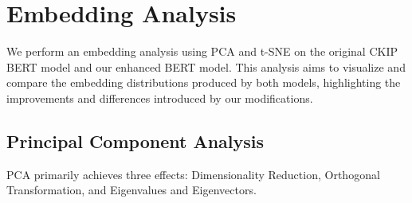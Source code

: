 \documentclass[PhD]{PHlab-thesis}
\begin{document}


\section{Embedding Analysis}
We perform an embedding analysis using PCA and t-SNE on the original CKIP BERT model and our enhanced BERT model. This analysis aims to visualize and compare the embedding distributions produced by both models, highlighting the improvements and differences introduced by our modifications.

\subsection{Principal Component Analysis}
PCA primarily achieves three effects: Dimensionality Reduction, Orthogonal Transformation, and Eigenvalues and Eigenvectors.
\end{document}
